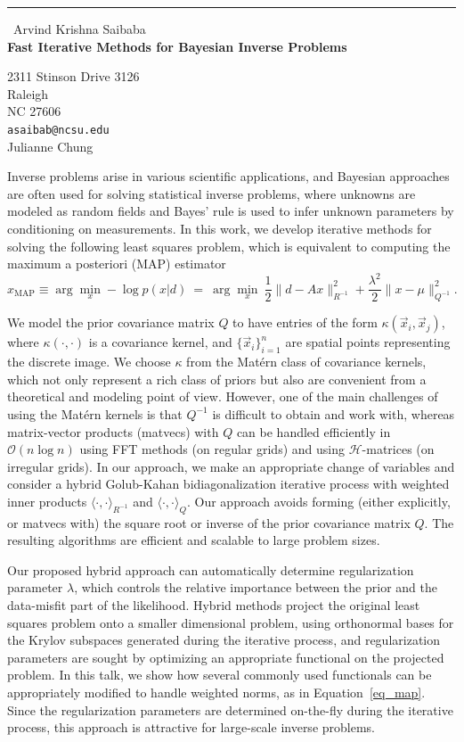\documentclass{report}
\begin{document}
\begin{center}
\rule{6in}{1pt} \
{\large Arvind Krishna Saibaba \\
{\bf Fast Iterative Methods for Bayesian Inverse Problems}}

2311 Stinson Drive 3126 \\ Raleigh \\ NC 27606
\\
{\tt asaibab@ncsu.edu}\\
Julianne Chung\end{center}

Inverse problems arise in various scientific applications, and Bayesian
approaches are often used for solving statistical inverse problems, where
unknowns are modeled as random fields and Bayes' rule {is used} to infer
unknown parameters by conditioning on measurements. In this work, we
develop iterative methods for solving the following least squares
problem, which is equivalent to computing the maximum a posteriori (MAP)
estimator
\begin{equation}\label{eq_map}
\hat{x}_\text{MAP} \equiv {\arg}\min_x - \log p(x|d) \> =\>{\arg}\min_x
\> \frac{1}{2}\|d-Ax\|_{R^{-1}}^2 +
\frac{\lambda^2}{2}\|x-\mu\|_{Q^{-1}}^2.
\end{equation}

We model the prior covariance matrix $Q$ to have entries of the form
$\kappa(\vec{x}_i,\vec{x}_j)$, where $\kappa(\cdot,\cdot)$ is a
covariance kernel, and $\{\vec{x}_i\}_{i=1}^n$ are spatial points
representing the discrete image. We choose $\kappa$ from the Mat\'{e}rn
class of covariance kernels, which not only represent a rich class of
priors but also
are convenient from a theoretical and modeling point of view. However,
one of the main challenges of using the Mat\'{e}rn kernels is that
$Q^{-1}$ is difficult to obtain and work with, whereas matrix-vector
products (matvecs) with $Q$ can be handled efficiently in
$\mathcal{O}(n\log n)$ using FFT methods (on regular grids) and using
$\mathcal{H}$-matrices (on irregular grids). In our approach, we make an
appropriate change of variables and consider a hybrid Golub-Kahan
bidiagonalization iterative process with weighted inner products $\langle
\cdot, \cdot \rangle_{R^{-1}} $ and $\langle \cdot, \cdot \rangle_{Q} $.
Our approach avoids forming (either explicitly, or matvecs with) the
square root or inverse of the prior covariance matrix $Q$. The resulting
algorithms are efficient and scalable to large problem sizes.

Our proposed hybrid approach can automatically determine regularization
parameter $\lambda$, which controls the relative importance between the
prior and the data-misfit part of the likelihood. Hybrid methods project
the original least squares problem onto a smaller dimensional problem,
using orthonormal bases for the Krylov subspaces generated during the
iterative process, and regularization parameters are sought by optimizing
an appropriate functional on the projected problem. In this talk, we show
how several commonly used functionals can be appropriately modified to
handle weighted norms, as in Equation~\eqref{eq_map}. Since the
regularization parameters are determined on-the-fly during the iterative
process, this approach is attractive for large-scale inverse problems.
\end{document}
